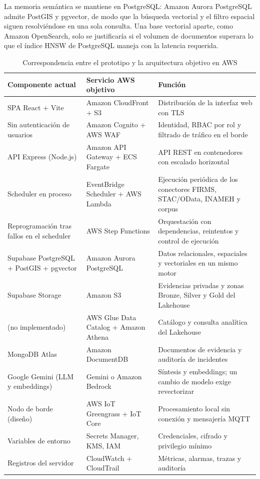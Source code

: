 \documentclass[conference]{IEEEtran}
\begin{document}
La memoria semántica se mantiene en PostgreSQL: Amazon Aurora PostgreSQL admite PostGIS y pgvector, de modo que la búsqueda vectorial y el filtro espacial siguen resolviéndose en una sola consulta. Una base vectorial aparte, como Amazon OpenSearch, solo se justificaría si el volumen de documentos superara lo que el índice HNSW de PostgreSQL maneja con la latencia requerida.

\begin{table}[!t]
\caption{Correspondencia entre el prototipo y la arquitectura objetivo en AWS}
\label{tab:aws}
\centering
\footnotesize
\setlength{\tabcolsep}{4pt}
\begin{tabular}{@{}p{42mm} p{48mm} p{78mm}@{}}
\toprule
Componente actual & Servicio AWS objetivo & Función \\
\midrule
SPA React + Vite & Amazon CloudFront + S3 & Distribución de la interfaz web con TLS \\
Sin autenticación de usuarios & Amazon Cognito + AWS WAF & Identidad, RBAC por rol y filtrado de tráfico en el borde \\
API Express (Node.js) & Amazon API Gateway + ECS Fargate & API REST en contenedores con escalado horizontal \\
Scheduler en proceso & EventBridge Scheduler + AWS Lambda & Ejecución periódica de los conectores FIRMS, STAC/OData, INAMEH y corpus \\
Reprogramación tras fallos en el scheduler & AWS Step Functions & Orquestación con dependencias, reintentos y control de ejecución \\
Supabase PostgreSQL + PostGIS + pgvector & Amazon Aurora PostgreSQL & Datos relacionales, espaciales y vectoriales en un mismo motor \\
Supabase Storage & Amazon S3 & Evidencias privadas y zonas Bronze, Silver y Gold del Lakehouse \\
(no implementado) & AWS Glue Data Catalog + Amazon Athena & Catálogo y consulta analítica del Lakehouse \\
MongoDB Atlas & Amazon DocumentDB & Documentos de evidencia y auditoría de incidentes \\
Google Gemini (LLM y embeddings) & Gemini o Amazon Bedrock & Síntesis y embeddings; un cambio de modelo exige revectorizar \\
Nodo de borde (diseño) & AWS IoT Greengrass + IoT Core & Procesamiento local sin conexión y mensajería MQTT \\
Variables de entorno & Secrets Manager, KMS, IAM & Credenciales, cifrado y privilegio mínimo \\
Registros del servidor & CloudWatch + CloudTrail & Métricas, alarmas, trazas y auditoría \\
\bottomrule
\end{tabular}
\end{table}
\end{document}
